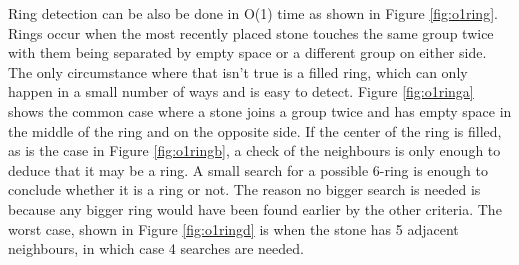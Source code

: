 Ring detection can be also be done in O(1) time as shown in Figure \ref{fig:o1ring}. Rings occur when the most recently placed stone touches the same group twice with them being separated by empty space or a different group on either side. The only circumstance where that isn't true is a filled ring, which can only happen in a small number of ways and is easy to detect. Figure \ref{fig:o1ringa} shows the common case where a stone joins a group twice and has empty space in the middle of the ring and on the opposite side. If the center of the ring is filled, as is the case in Figure \ref{fig:o1ringb}, a check of the neighbours is only enough to deduce that it may be a ring. A small search for a possible 6-ring is enough to conclude whether it is a ring or not. The reason no bigger search is needed is because any bigger ring would have been found earlier by the other criteria. The worst case, shown in Figure \ref{fig:o1ringd} is when the stone has 5 adjacent neighbours, in which case 4 searches are needed.

